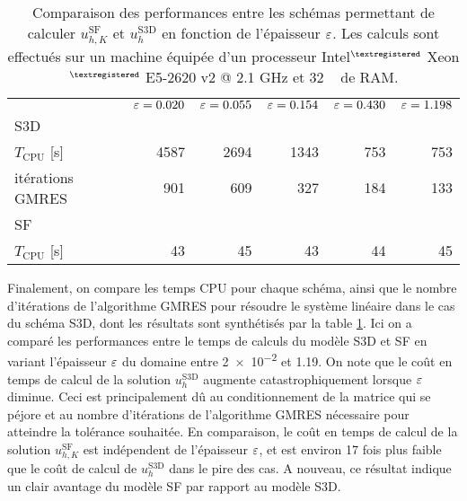 \begin{table}[t!]
  \caption{Comparaison des performances entre les schémas permettant
    de calculer $u_{h,K}^{\mathrm{SF}}$ et $u_h^\mathrm{S3D}$ en
    fonction de l'épaisseur $\varepsilon$. Les calculs
    sont effectués sur un machine équipée d'un processeur Intel$^{\tiny{\textregistered}}$ Xeon$^{\tiny{\textregistered}}$
    E5-2620 v2 @ 2.1 \si{\giga\hertz} et 32 \si{\giga\octet} de RAM.}
  \label{tab:e-sf-e-s3d-cpu-cost}
  \begin{center}
    \begin{tabular}{@{}lrrrrr@{}}
      \toprule
      & $\varepsilon = 0.020$
      & $\varepsilon = 0.055$
      & $\varepsilon = 0.154$
      & $\varepsilon = 0.430$
      & $\varepsilon = 1.198$ \\
      \cmidrule{2-6}
      S3D  \\
      \hphantom{a} $T_\text{CPU}$ [\si{\second}] & 4587 & 2694 & 1343 & 753 & 753 \\
      \hphantom{a} itérations GMRES           & 901 & 609  & 327  & 184 & 133 \\
      SF \\
      \hphantom{a} $T_\text{CPU}$ [\si{\second}] & 43 & 45   & 43   & 44  & 45  \\
      \bottomrule
    \end{tabular}
  \end{center}
\end{table}

Finalement, on compare les temps CPU pour chaque schéma, ainsi
que le nombre d'itérations de l'algorithme GMRES pour résoudre le
système linéaire dans le cas du schéma S3D, dont les résultats sont
synthétisés par la table \ref{tab:e-sf-e-s3d-cpu-cost}. Ici on a
comparé les performances entre le temps de calculs du modèle S3D et SF
en variant l'épaisseur $\varepsilon$ du domaine entre \num{2e-2} et
\num{1.19}. On note que le coût en temps de calcul de la solution
$u_h^\mathrm{S3D}$ augmente catastrophiquement lorsque $\varepsilon$
diminue. Ceci est principalement dû au conditionnement de la matrice
qui se péjore et au nombre d'itérations de
l'algorithme GMRES nécessaire pour atteindre la tolérance souhaitée.
En comparaison, le coût en temps de calcul de la solution
$u_{h,K}^{\mathrm{SF}}$ est indépendent de l'épaisseur $\varepsilon$,
et est environ 17 fois plus faible que le coût de calcul de
$u_h^\mathrm{S3D}$ dans le pire des cas. A nouveau, ce résultat
indique un clair avantage du modèle SF par rapport au modèle S3D.


\renewcommand{\floatpagefraction}{.6}%
\renewcommand{\topfraction}{0.7}
